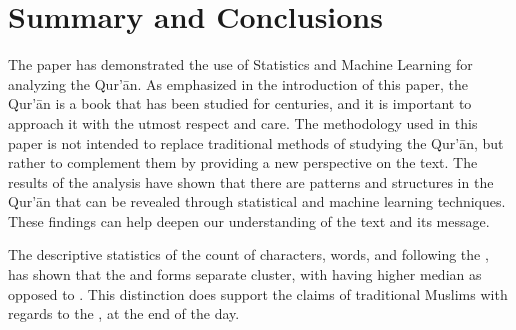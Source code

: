 \chapter{Summary and Conclusions}\label{ch:conclusion}
The paper has demonstrated the use of Statistics and Machine Learning for analyzing the Qur'\=an. As emphasized in the introduction of this paper, the Qur'\=an is a book that has been studied for centuries, and it is important to approach it with the utmost respect and care. The methodology used in this paper is not intended to replace traditional methods of studying the Qur'\=an, but rather to complement them by providing a new perspective on the text. The results of the analysis have shown that there are patterns and structures in the Qur'\=an that can be revealed through statistical and machine learning techniques. These findings can help deepen our understanding of the text and its message.

The descriptive statistics of the count of characters, words, and   following the  , has shown that the   and  \newline{}  forms separate cluster, with   having higher median as opposed to  . This distinction does support the claims of traditional Muslims with regards to the  , at the end of the day.